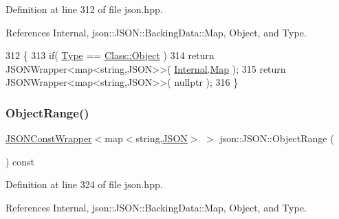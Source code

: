 Definition at line 312 of file json.\+hpp.



References Internal, json\+::\+J\+S\+O\+N\+::\+Backing\+Data\+::\+Map, Object, and Type.


\begin{DoxyCode}
312                                                     \{
313             \textcolor{keywordflow}{if}( \mbox{\hyperlink{classjson_1_1_j_s_o_n_a3fa6923afa41bdfe38077fbc0079aaf5}{Type}} == \mbox{\hyperlink{classjson_1_1_j_s_o_n_a762f55df6d407c1af61607ed516ffe07a497031794414a552435f90151ac3b54b}{Class::Object}} )
314                 \textcolor{keywordflow}{return} JSONWrapper<map<string,JSON>>( \mbox{\hyperlink{classjson_1_1_j_s_o_n_a1e2a064794c3d55c8bb8887fc5734947}{Internal}}.\mbox{\hyperlink{unionjson_1_1_j_s_o_n_1_1_backing_data_ab2e19b00745b37d2add157ff3a35c431}{Map}} );
315             \textcolor{keywordflow}{return} JSONWrapper<map<string,JSON>>( nullptr );
316         \}
\end{DoxyCode}
\mbox{\label{classjson_1_1_j_s_o_n_a23a72db5a52bca8b080334198bb25041}} 
\subsubsection{\texorpdfstring{Object\+Range()}{ObjectRange()}\hspace{0.1cm}{\footnotesize\ttfamily [2/2]}}
{\footnotesize\ttfamily \mbox{\hyperlink{classjson_1_1_j_s_o_n_1_1_j_s_o_n_const_wrapper}{J\+S\+O\+N\+Const\+Wrapper}}$<$map$<$string,\mbox{\hyperlink{classjson_1_1_j_s_o_n}{J\+S\+ON}}$>$ $>$ json\+::\+J\+S\+O\+N\+::\+Object\+Range (\begin{DoxyParamCaption}{ }\end{DoxyParamCaption}) const\hspace{0.3cm}{\ttfamily [inline]}}



Definition at line 324 of file json.\+hpp.



References Internal, json\+::\+J\+S\+O\+N\+::\+Backing\+Data\+::\+Map, Object, and Type.



